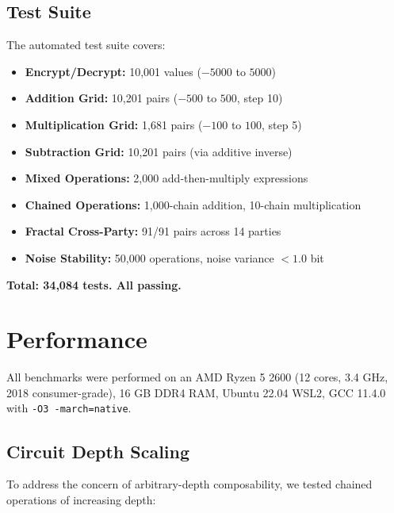 \documentclass[11pt,a4paper]{article}
\begin{document}
\subsection{Test Suite}

The automated test suite covers:
\begin{itemize}
    \item \textbf{Encrypt/Decrypt:} 10,001 values ($-5000$ to $5000$)
    \item \textbf{Addition Grid:} 10,201 pairs ($-500$ to $500$, step 10)
    \item \textbf{Multiplication Grid:} 1,681 pairs ($-100$ to $100$, step 5)
    \item \textbf{Subtraction Grid:} 10,201 pairs (via additive inverse)
    \item \textbf{Mixed Operations:} 2,000 add-then-multiply expressions
    \item \textbf{Chained Operations:} 1,000-chain addition, 10-chain multiplication
    \item \textbf{Fractal Cross-Party:} 91/91 pairs across 14 parties
    \item \textbf{Noise Stability:} 50,000 operations, noise variance $< 1.0$ bit
\end{itemize}

\textbf{Total: 34,084 tests. All passing.}

\section{Performance}
\label{sec:perf}

All benchmarks were performed on an AMD Ryzen 5 2600 (12 cores, 3.4 GHz, 2018 consumer-grade), 16 GB DDR4 RAM, Ubuntu 22.04 WSL2, GCC 11.4.0 with \texttt{-O3 -march=native}.

\subsection{Circuit Depth Scaling}

To address the concern of arbitrary-depth composability, we tested chained operations of increasing depth:
\end{document}
